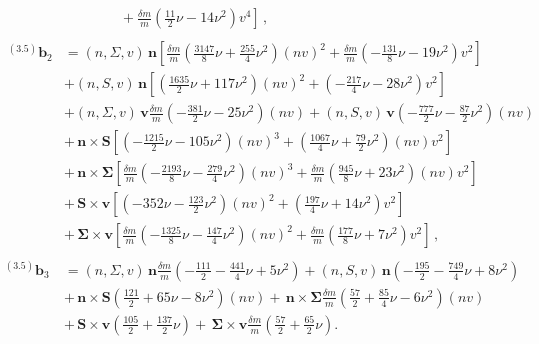 {\begin{align}
    &\left.\qquad\qquad+\frac{\delta m}{m}\left(\frac{11}{2} \nu -14 \nu^2\right) v^{4}\right] \, ,\\
    \nonumber \\\
    {}^{(3.5)}\mathbf{b}_{2} &= (n,\Sigma ,v) \, \mathbf{n} \left[\frac{\delta m}{m}\left(\frac{3147}{8} \nu + \frac{255}{4} \nu^2\right) (nv)^2+\frac{\delta m}{m}\left(-\frac{131}{8} \nu -19 \nu^2\right) v^{2}\right] \nonumber \\
& + (n,S,v) \, \mathbf{n} \left[\left(\frac{1635}{2} \nu + 117 \nu^2\right) (nv)^2+\left(-\frac{217}{4} \nu -28 \nu^2\right) v^{2}\right] \nonumber \\
& + (n,\Sigma ,v) \, \mathbf{v} \frac{\delta m}{m}\left(-\frac{381}{2} \nu -25 \nu^2\right) (nv) + (n,S,v) \, \mathbf{v} \left(-\frac{777}{2} \nu -\frac{87}{2} \nu^2\right) (nv) \nonumber \\
& + \, \mathbf{ n \times S } \left[\left(-\frac{1215}{2} \nu -105 \nu^2\right) (nv)^3+\left(\frac{1067}{4} \nu + \frac{79}{2} \nu^2\right) (nv) v^{2}\right] \nonumber \\
& + \, \mathbf{ n \times \Sigma } \left[\frac{\delta m}{m}\left(-\frac{2193}{8} \nu -\frac{279}{4} \nu^2\right) (nv)^3+\frac{\delta m}{m}\left(\frac{945}{8} \nu + 23 \nu^2\right) (nv) v^{2}\right] \nonumber \\
& + \, \mathbf{ S \times v } \left[\left(-352 \nu -\frac{123}{2} \nu^2\right) (nv)^2+\left(\frac{197}{4} \nu + 14 \nu^2\right) v^{2}\right] \nonumber \\
& + \, \mathbf{ \Sigma \times v } \left[\frac{\delta m}{m}\left(-\frac{1325}{8} \nu -\frac{147}{4} \nu^2\right) (nv)^2+\frac{\delta m}{m}\left(\frac{177}{8} \nu + 7 \nu^2\right) v^{2}\right] \, ,\\
\nonumber \\ 
    {}^{(3.5)}\mathbf{b}_{3} &= (n,\Sigma ,v) \, \mathbf{n} \frac{\delta m}{m}\left(-\frac{111}{2} -\frac{441}{4} \nu + 5 \nu^2\right) + (n,S,v) \, \mathbf{n} \left(-\frac{195}{2} -\frac{749}{4} \nu + 8 \nu^2\right) \nonumber \\
& + \, \mathbf{ n \times S } \left(\frac{121}{2} + 65 \nu -8 \nu^2\right) (nv) + \, \mathbf{ n \times \Sigma } \frac{\delta m}{m}\left(\frac{57}{2} + \frac{85}{4} \nu -6 \nu^2\right) (nv) \nonumber \\
& + \, \mathbf{ S \times v } \left(\frac{105}{2} + \frac{137}{2} \nu\right) + \, \mathbf{ \Sigma \times v } \frac{\delta m}{m}\left(\frac{57}{2} + \frac{65}{2} \nu\right).
\end{align}}